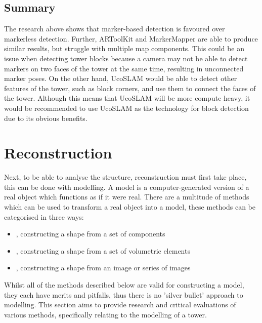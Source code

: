 \subsection{Summary}\label{subsec:detectionsummary}

The research above shows that marker-based detection is favoured over markerless detection. Further, ARToolKit and MarkerMapper are able to produce similar results, but struggle with multiple map components. This could be an issue when detecting tower blocks because a camera may not be able to detect markers on two faces of the tower at the same time, resulting in unconnected marker poses. On the other hand, UcoSLAM would be able to detect other features of the tower, such as block corners, and use them to connect the faces of the tower. Although this means that UcoSLAM will be more compute heavy, it would be recommended to use UcoSLAM as the technology for block detection due to its obvious benefits.


\section{Reconstruction}\label{sec:reconstruction}

Next, to be able to analyse the structure, reconstruction must first take place, this can be done with modelling. A model is a computer-generated version of a real object which functions as if it were real. There are a multitude of methods which can be used to transform a real object into a model, these methods can be categorised in three ways:

\begin{itemize}
    \item {}, constructing a shape from a set of components
    \item {}, constructing a shape from a set of volumetric elements
    \item {}, constructing a shape from an image or series of images
\end{itemize}

Whilst all of the methods described below are valid for constructing a model, they each have merits  and pitfalls, thus there is no 'silver bullet' approach to modelling. This section aims to provide research and critical evaluations of various methods, specifically relating to the modelling of a \jenga{} tower.

